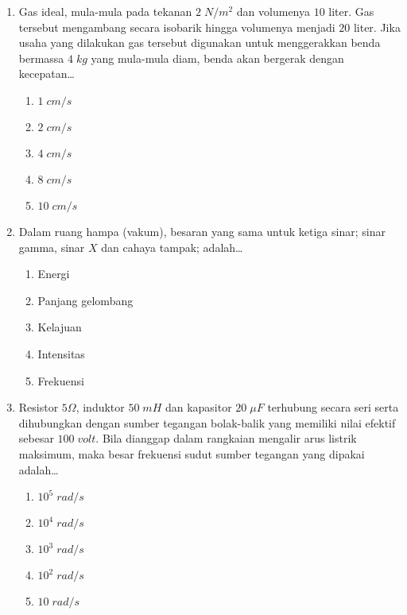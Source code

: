 \documentclass[A4,12PT, english, twocolumn]{journal}
\begin{document}
\begin{enumerate}
\item Gas ideal, mula-mula pada tekanan $2 \; N/m^2$ dan volumenya $10$ liter. Gas tersebut mengambang secara isobarik hingga volumenya menjadi $20$ liter. Jika usaha yang dilakukan gas tersebut digunakan untuk menggerakkan benda bermassa $4 \; kg$ yang mula-mula diam, benda akan bergerak dengan kecepatan\dots
    \begin{enumerate}
        \item $1 \; cm/s$
        \item $2 \; cm/s$
        \item $4 \; cm/s$
        \item $8 \; cm/s$
        \item $10 \; cm/s$
    \end{enumerate}

\item Dalam ruang hampa (vakum), besaran yang sama untuk ketiga sinar; sinar gamma, sinar $X$ dan cahaya tampak; adalah\dots
    \begin{enumerate}
        \item Energi
        \item Panjang gelombang
        \item Kelajuan
        \item Intensitas
        \item Frekuensi
    \end{enumerate}

\item Resistor $5 \Omega$, induktor $50 \; mH$ dan kapasitor $20 \; \mu F$ terhubung secara seri serta dihubungkan dengan sumber tegangan bolak-balik yang memiliki nilai efektif sebesar $100 \; volt$. Bila dianggap dalam rangkaian mengalir arus listrik maksimum, maka besar frekuensi sudut sumber tegangan yang dipakai adalah\dots
    \begin{enumerate}
        \item $10^5 \; rad/s$
        \item $10^4 \; rad/s$
        \item $10^3 \; rad/s$
        \item $10^2 \; rad/s$
        \item $10 \; rad/s$
    \end{enumerate}

\end{enumerate}
\end{document}
